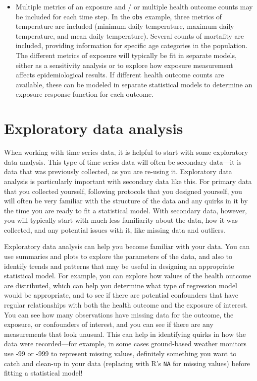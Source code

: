 \documentclass[
]{book}
\begin{document}
\begin{itemize}
  between air pollution and mortality risk).
\item
  Multiple metrics of an exposure and / or multiple health outcome counts
  may be included for each time step. In the \texttt{obs} example, three metrics of
  temperature are included (minimum daily temperature, maximum daily temperature,
  and mean daily temperature). Several counts of mortality are included, providing
  information for specific age categories in the population. The different metrics
  of exposure will typically be fit in separate models, either as a sensitivity
  analysis or to explore how exposure measurement affects epidemiological results.
  If different health outcome counts are available, these can be modeled in separate
  statistical models to determine an exposure-response function for each outcome.
\end{itemize}

\section{Exploratory data analysis}\label{exploratory-data-analysis}

When working with time series data, it is helpful to start with some exploratory
data analysis. This type of time series data will often be secondary data---it is
data that was previously collected, as you are re-using it. Exploratory data analysis
is particularly important with secondary data like this. For primary data that you
collected yourself, following protocols that you designed yourself, you will often
be very familiar with the structure of the data and any quirks in it by the time
you are ready to fit a statistical model. With secondary data, however, you will
typically start with much less familiarity about the data, how it was collected, and
any potential issues with it, like missing data and outliers.

Exploratory data analysis can help you become familiar with your data. You can use
summaries and plots to explore the parameters of the data, and also to identify
trends and patterns that may be useful in designing an appropriate statistical
model. For example, you can explore how values of the health outcome are distributed,
which can help you determine what type of regression model would be appropriate, and
to see if there are potential confounders that have regular relationships with
both the health outcome and the exposure of interest. You can see how many
observations have missing data for the outcome, the exposure, or confounders of
interest, and you can see if there are any measurements that look unusual.
This can help in identifying quirks in how the data were recorded---for example,
in some cases ground-based weather monitors use -99 or -999 to represent missing
values, definitely something you want to catch and clean-up in your data
(replacing with R's \texttt{NA} for missing values) before fitting a statistical model!
\end{document}
